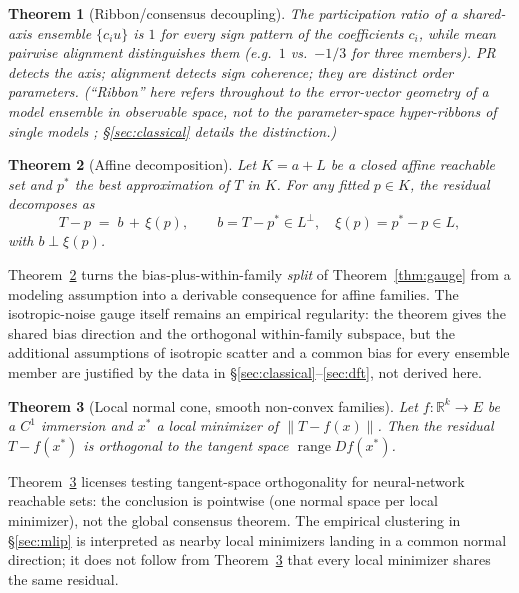 \documentclass[11pt]{article}
\newtheorem{theorem}{Theorem}
\begin{document}
\begin{theorem}[Ribbon/consensus decoupling]\label{thm:decouple}
The participation ratio of a shared-axis ensemble $\{c_i u\}$ is $1$ for every
sign pattern of the coefficients $c_i$, while mean pairwise alignment
distinguishes them (e.g.\ $1$ vs.\ $-1/3$ for three members). PR detects the
\emph{axis}; alignment detects \emph{sign coherence}; they are distinct order
parameters. (``Ribbon'' here refers throughout to the error-vector geometry of
a model \emph{ensemble} in observable space, not to the parameter-space
hyper-ribbons of single models \citealp{transtrum2011,kurniawan2022};
\S\ref{sec:classical} details the distinction.)
\end{theorem}

\begin{theorem}[Affine decomposition]\label{thm:affine}
Let $K = a + L$ be a closed affine reachable set and $p^*$ the best
approximation of $T$ in $K$. For any fitted $p \in K$, the residual decomposes
as
\[
T - p \;=\; b \, +\, \xi(p),
\qquad b = T - p^* \in L^\perp, \quad \xi(p) = p^* - p \in L,
\]
with $b \perp \xi(p)$.
\end{theorem}

Theorem~\ref{thm:affine} turns the bias-plus-within-family \emph{split} of
Theorem~\ref{thm:gauge} from a modeling assumption into a derivable
consequence for affine families. The isotropic-noise gauge itself remains an
empirical regularity: the theorem gives the shared bias direction and the
orthogonal within-family subspace, but the additional assumptions of isotropic
scatter and a common bias for every ensemble member are justified by the data
in \S\ref{sec:classical}--\ref{sec:dft}, not derived here.

\begin{theorem}[Local normal cone, smooth non-convex families]\label{thm:smooth}
Let $f: \mathbb{R}^k \to E$ be a $C^1$ immersion and $x^*$ a local minimizer
of $\|T - f(x)\|$. Then the residual $T - f(x^*)$ is orthogonal to the tangent
space $\operatorname{range} Df(x^*)$.
\end{theorem}

Theorem~\ref{thm:smooth} licenses testing tangent-space orthogonality for
neural-network reachable sets: the conclusion is pointwise (one normal space
per local minimizer), not the global consensus theorem. The empirical
clustering in \S\ref{sec:mlip} is interpreted as nearby local minimizers
landing in a common normal direction; it does not follow from
Theorem~\ref{thm:smooth} that every local minimizer shares the same residual.
\end{document}
